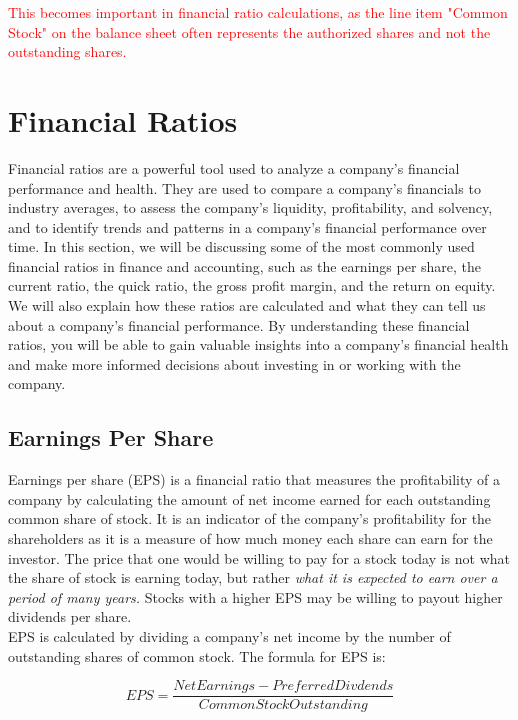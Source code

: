 \documentclass{article}
\begin{document}
\textcolor{red}{This becomes important in financial ratio calculations, as the line item "Common Stock" on the balance sheet often represents the authorized shares and not the outstanding shares.}




\section{Financial Ratios}
Financial ratios are a powerful tool used to analyze a company's financial performance and health. They are used to compare a company's financials to industry averages, to assess the company's liquidity, profitability, and solvency, and to identify trends and patterns in a company's financial performance over time. In this section, we will be discussing some of the most commonly used financial ratios in finance and accounting, such as the earnings per share, the current ratio, the quick ratio, the gross profit margin, and the return on equity. We will also explain how these ratios are calculated and what they can tell us about a company's financial performance. By understanding these financial ratios, you will be able to gain valuable insights into a company's financial health and make more informed decisions about investing in or working with the company.

\subsection{Earnings Per Share}
Earnings per share (EPS) is a financial ratio that measures the profitability of a company by calculating the amount of net income earned for each outstanding common share of stock. It is an indicator of the company's profitability for the shareholders as it is a measure of how much money each share can earn for the investor. The price that one would be willing to pay for a stock today is not what the share of stock is earning today, but rather \textit{what it is expected to earn over a period of many years.} Stocks with a higher EPS may be willing to payout higher dividends per share. \\

EPS is calculated by dividing a company's net income by the number of outstanding shares of common stock. The formula for EPS is:

\begin{equation}
    EPS = \frac{Net Earnings - PreferredDivdends}{Common Stock Outstanding}
\end{equation}\\
\end{document}
